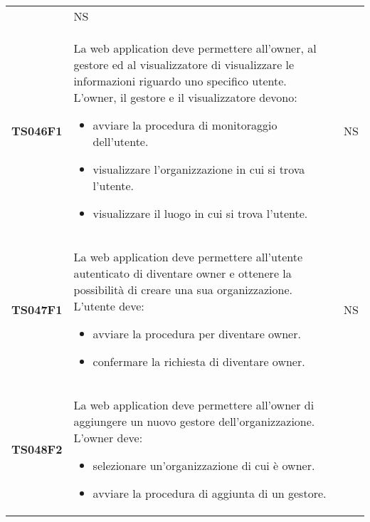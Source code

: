 \documentclass[../piano-di-qualifica.tex]{subfiles}
\begin{document}
\begin{centering}
\begin{longtable}[H]{>{\centering\bfseries}m{3cm} >{}p{10cm} >{\centering\arraybackslash}m{3cm}}
                       & NS                                                                                                                                                                                                                                                               \\
    TS046F1            & La web application deve permettere all'owner, al gestore ed al visualizzatore di visualizzare le informazioni riguardo uno specifico utente. \newline
    L'owner, il gestore e il visualizzatore devono:
    \begin{itemize}
      \item avviare la procedura di monitoraggio dell'utente.
      \item visualizzare l'organizzazione in cui si trova l'utente.
      \item visualizzare il luogo in cui si trova l'utente.
    \end{itemize}
                       & NS                                                                                                                                                                                                                                                               \\
    TS047F1            & La web application deve permettere all'utente autenticato di diventare owner e ottenere la possibilità di creare una sua organizzazione. \newline
    L'utente deve:
    \begin{itemize}
      \item avviare la procedura per diventare owner.
      \item confermare la richiesta di diventare owner.
    \end{itemize}
                       & NS                                                                                                                                                                                                                                                               \\
    TS048F2            & La web application deve permettere all'owner di aggiungere un nuovo gestore dell'organizzazione. \newline
    L'owner deve:
    \begin{itemize}
      \item selezionare un'organizzazione di cui è owner.
      \item avviare la procedura di aggiunta di un gestore.

\end{itemize}
\end{longtable}
\end{centering}
\end{document}
